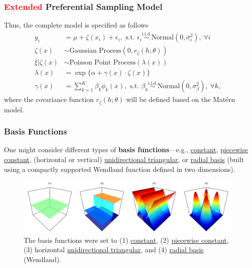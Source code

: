 \documentclass[10pt, aspectratio = 169, handout]{beamer} %
\let\oldtextbf\textbf
\renewcommand\textbf[1]{\textcolor{titles}{\oldtextbf{#1}}}
\begin{document}
	  \begin{frame}[t]
		\frametitle{\textcolor{red}{Extended} Preferential Sampling Model}
		\justifying

        Thus, the complete model is specified as follows
        \begin{align} \label{eq:full-model}
        	y_i &= \mu + \zeta(x_i) + \epsilon_i, \text{ s.t. } \epsilon_i \overset{\text{i.i.d.}}{\sim} \text{Normal}(0, \sigma^2_{\epsilon}),~\forall i \\ 
            \zeta(x) &\sim \text{Gaussian Process}(0, r_\zeta(h; \theta)) \nonumber \\ 
            \xi|\zeta(x) &\sim \text{Poisson Point Process}(\lambda(x)) \nonumber \\ 
            \lambda(x) &= \exp\{\alpha + \gamma(x) \cdot \zeta(x)\} \nonumber \\ 
            \gamma(x) &= \sum_{k = 1}^{K}\beta_k \phi_k(x), \text{ s.t. } \beta_k \overset{\text{i.i.d.}}{\sim} \text{Normal}(0, \sigma^2_{\beta}),~\forall k, \nonumber
        \end{align}
        where the covariance function $r_\zeta(h; \theta)$ will be defined based on the Matérn model.
	\end{frame}

 	  \begin{frame}[t]
		\frametitle{Basis Functions}
		\justifying

        One might consider different types of \textbf{basis functions}---e.g., \ul{constant}, \ul{piecewise constant}, (horizontal or vertical) \ul{unidirectional triangular}, or \ul{radial basis} (built using a compactly supported Wendland function defined in two dimensions).

        \begin{figure}[!ht]
        	\centering
        	\includegraphics[width = 1\textwidth]{Images/basis-functions.jpeg}
            \caption{\justifying The basis functions were set to (1) \ul{constant}, (2) \ul{piecewise constant}, (3) horizontal \ul{unidirectional triangular}, and (4) \ul{radial basis} (Wendland).}
        	\label{fig:basis-functions}
        \end{figure}
	\end{frame}
\end{document}
